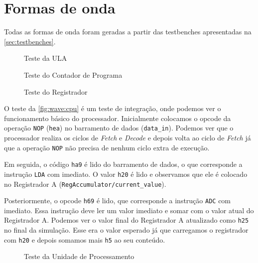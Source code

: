 \documentclass[
	12pt,				  %
	openright,		%
	a4paper,			%
	english,			%
	french,				%
	spanish,			%
	brazil,				%
]{abntex2}
\newcommand{\code}[1]{\colorbox{light-gray}{\texttt{#1}}}
\begin{document}


\section{Formas de onda}

Todas as formas de onda foram geradas a partir das testbenches apresentadas na \autoref{sec:testbenches}.


\begin{figure}[h]
	\centering
	\caption{Teste da ULA} \label{fig:wave:alu}
	
\end{figure}

\begin{figure}[h]
	\centering
	\caption{Teste do Contador de Programa} \label{fig:wave:pc}
	
\end{figure}

\begin{figure}[h]
	\centering
	\caption{Teste do Registrador} \label{fig:wave:register}
	
\end{figure}

O teste da \autoref{fig:wave:cpu} é um teste de integração, onde podemos ver o funcionamento
básico do processador.
Inicialmente colocamos o opcode da operação \code{NOP} (\code{hea}) no barramento de dados (\code{data{\_}in}).
Podemos ver que o processador realiza os ciclos de \emph{Fetch} e \emph{Decode} e depois volta ao ciclo de \emph{Fetch}
já que a operação \code{NOP} não precisa de nenhum ciclo extra de execução.

Em seguida, o código \code{ha9} é lido do barramento de dados, o que corresponde a instrução \code{LDA} com imediato.
O valor \code{h20} é lido e observamos que ele é colocado no Registrador A (\code{RegAccumulator/current{\_}value}).

Posteriormente, o opcode \code{h69} é lido, que corresponde a instrução \code{ADC} com imediato. Essa instrução
deve ler um valor imediato e somar com o valor atual do Registrador A.
Podemos ver o valor final do Registrador A atualizado como \code{h25} no final da simulação. Esse era
o valor esperado já que carregamos o registrador com \code{h20} e depois somamos mais \code{h5} ao seu conteúdo.


\begin{figure}[h]
	\centering
	\caption{Teste da Unidade de Processamento} \label{fig:wave:cpu}
	
\end{figure}
\end{document}
